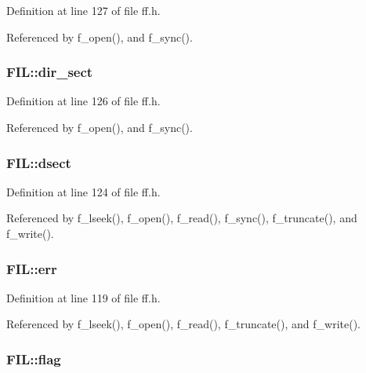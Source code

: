 Definition at line 127 of file ff.\-h.



Referenced by f\-\_\-open(), and f\-\_\-sync().

\hypertarget{structFIL_ab203794f939ad4480e81dfa488770783}{
\subsubsection[{dir\-\_\-sect}]{ F\-I\-L\-::dir\-\_\-sect}}\label{structFIL_ab203794f939ad4480e81dfa488770783}


Definition at line 126 of file ff.\-h.



Referenced by f\-\_\-open(), and f\-\_\-sync().

\hypertarget{structFIL_ab3d4165d6fd32ac71a130d835fbf0b4d}{
\subsubsection[{dsect}]{ F\-I\-L\-::dsect}}\label{structFIL_ab3d4165d6fd32ac71a130d835fbf0b4d}


Definition at line 124 of file ff.\-h.



Referenced by f\-\_\-lseek(), f\-\_\-open(), f\-\_\-read(), f\-\_\-sync(), f\-\_\-truncate(), and f\-\_\-write().

\hypertarget{structFIL_aea440945db26de9c4a88065c0c887fda}{
\subsubsection[{err}]{ F\-I\-L\-::err}}\label{structFIL_aea440945db26de9c4a88065c0c887fda}


Definition at line 119 of file ff.\-h.



Referenced by f\-\_\-lseek(), f\-\_\-open(), f\-\_\-read(), f\-\_\-truncate(), and f\-\_\-write().

\hypertarget{structFIL_ac409508881f5a16f2998ae675072b376}{
\subsubsection[{flag}]{ F\-I\-L\-::flag}}\label{structFIL_ac409508881f5a16f2998ae675072b376}


